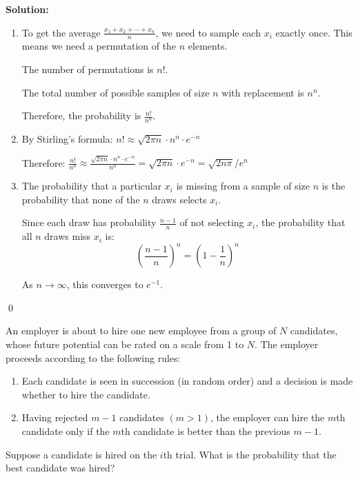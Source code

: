 \noindent\textbf{Solution:}
\begin{enumerate}[label=(\alph*)]
    \item To get the average $\frac{x_1 + x_2 + \cdots + x_n}{n}$, we need to sample each $x_i$ exactly once. This means we need a permutation of the $n$ elements.
    
    The number of permutations is $n!$.
    
    The total number of possible samples of size $n$ with replacement is $n^n$.
    
    Therefore, the probability is $\frac{n!}{n^n}$.
    
    \item By Stirling's formula: $n! \approx \sqrt{2\pi n} \cdot n^n \cdot e^{-n}$
    
    Therefore: $\frac{n!}{n^n} \approx \frac{\sqrt{2\pi n} \cdot n^n \cdot e^{-n}}{n^n} = \sqrt{2\pi n} \cdot e^{-n} = \sqrt{2n\pi}/e^n$
    
    \item The probability that a particular $x_i$ is missing from a sample of size $n$ is the probability that none of the $n$ draws selects $x_i$.
    
    Since each draw has probability $\frac{n-1}{n}$ of not selecting $x_i$, the probability that all $n$ draws miss $x_i$ is:
    \[ \left(\frac{n-1}{n}\right)^n = \left(1 - \frac{1}{n}\right)^n \]
    
    As $n \to \infty$, this converges to $e^{-1}$.
\end{enumerate}



\qed
\begin{problembox}
An employer is about to hire one new employee from a group of $N$ candidates, whose future potential can be rated on a scale from 1 to $N$. The employer proceeds according to the following rules:
\begin{enumerate}[label=(\roman*)]
    \item Each candidate is seen in succession (in random order) and a decision is made whether to hire the candidate.
    \item Having rejected $m-1$ candidates $(m>1)$, the employer can hire the $m$th candidate only if the $m$th candidate is better than the previous $m-1$.
\end{enumerate}
Suppose a candidate is hired on the $i$th trial. What is the probability that the best candidate was hired?
\end{problembox}


